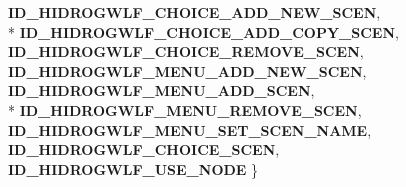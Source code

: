 \begin{DoxyCompactItemize}
{\bf I\+D\+\_\+\+H\+I\+D\+R\+O\+G\+W\+L\+F\+\_\+\+C\+H\+O\+I\+C\+E\+\_\+\+A\+D\+D\+\_\+\+N\+E\+W\+\_\+\+S\+C\+EN}, 
\\*
{\bf I\+D\+\_\+\+H\+I\+D\+R\+O\+G\+W\+L\+F\+\_\+\+C\+H\+O\+I\+C\+E\+\_\+\+A\+D\+D\+\_\+\+C\+O\+P\+Y\+\_\+\+S\+C\+EN}, 
{\bf I\+D\+\_\+\+H\+I\+D\+R\+O\+G\+W\+L\+F\+\_\+\+C\+H\+O\+I\+C\+E\+\_\+\+R\+E\+M\+O\+V\+E\+\_\+\+S\+C\+EN}, 
{\bf I\+D\+\_\+\+H\+I\+D\+R\+O\+G\+W\+L\+F\+\_\+\+M\+E\+N\+U\+\_\+\+A\+D\+D\+\_\+\+N\+E\+W\+\_\+\+S\+C\+EN}, 
{\bf I\+D\+\_\+\+H\+I\+D\+R\+O\+G\+W\+L\+F\+\_\+\+M\+E\+N\+U\+\_\+\+A\+D\+D\+\_\+\+S\+C\+EN}, 
\\*
{\bf I\+D\+\_\+\+H\+I\+D\+R\+O\+G\+W\+L\+F\+\_\+\+M\+E\+N\+U\+\_\+\+R\+E\+M\+O\+V\+E\+\_\+\+S\+C\+EN}, 
{\bf I\+D\+\_\+\+H\+I\+D\+R\+O\+G\+W\+L\+F\+\_\+\+M\+E\+N\+U\+\_\+\+S\+E\+T\+\_\+\+S\+C\+E\+N\+\_\+\+N\+A\+ME}, 
{\bf I\+D\+\_\+\+H\+I\+D\+R\+O\+G\+W\+L\+F\+\_\+\+C\+H\+O\+I\+C\+E\+\_\+\+S\+C\+EN}, 
{\bf I\+D\+\_\+\+H\+I\+D\+R\+O\+G\+W\+L\+F\+\_\+\+U\+S\+E\+\_\+\+N\+O\+DE}
 \}
\end{DoxyCompactItemize}
